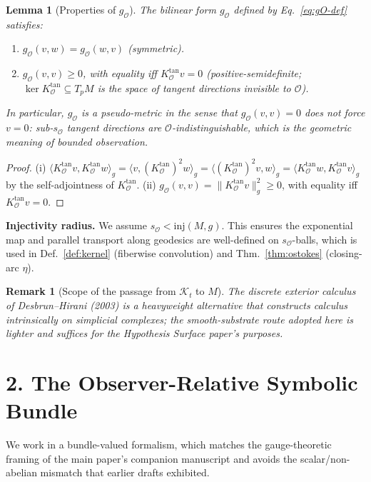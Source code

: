 \documentclass[11pt]{article}
\newtheorem{lemma}{Lemma}
\newtheorem{remark}{Remark}
\newcommand{\Kt}{\mathcal{K}_t}
\newcommand{\sO}{s_{\mathcal{O}}}  %
\newcommand{\Obs}{\mathcal{O}}
\newcommand{\gO}{g_{\Obs}}
\newcommand{\KO}{K_{\Obs}}
\begin{document}
\begin{lemma}[Properties of $\gO$]
\label{lem:gO}
The bilinear form $\gO$ defined by Eq.~\eqref{eq:gO-def} satisfies:
\begin{enumerate}[label=(\roman*)]
\item $\gO(v, w) = \gO(w, v)$ (symmetric).
\item $\gO(v, v) \geq 0$, with equality iff $\KO^{\mathrm{tan}} v = 0$
(positive-semidefinite; $\ker \KO^{\mathrm{tan}} \subseteq T_pM$ is
the space of tangent directions \emph{invisible to $\Obs$}).
\end{enumerate}
In particular, $\gO$ is a pseudo-metric in the sense that
$\gO(v, v) = 0$ does not force $v = 0$: sub-$\sO$ tangent directions
are $\Obs$-indistinguishable, which is the geometric meaning of
bounded observation.
\end{lemma}
\begin{proof}
(i) $\langle \KO^{\mathrm{tan}} v, \KO^{\mathrm{tan}} w \rangle_g
= \langle v, (\KO^{\mathrm{tan}})^2 w \rangle_g
= \langle (\KO^{\mathrm{tan}})^2 v, w \rangle_g
= \langle \KO^{\mathrm{tan}} w, \KO^{\mathrm{tan}} v \rangle_g$
by the self-adjointness of $\KO^{\mathrm{tan}}$.
(ii) $\gO(v, v) = \|\KO^{\mathrm{tan}} v\|_g^2 \geq 0$, with equality
iff $\KO^{\mathrm{tan}} v = 0$.
\end{proof}

\smallskip
\noindent\textbf{Injectivity radius.}
We assume $\sO < \mathrm{inj}(M, g)$. This ensures the exponential
map and parallel transport along geodesics are well-defined on
$\sO$-balls, which is used in Def.~\ref{def:kernel} (fiberwise
convolution) and Thm.~\ref{thm:ostokes} (closing-arc $\eta$).

\begin{remark}[Scope of the passage from $\Kt$ to $M$]
\label{rem:passage}
The discrete exterior calculus of Desbrun--Hirani (2003) is a
heavyweight alternative that constructs calculus intrinsically on
simplicial complexes; the smooth-substrate route adopted here is
lighter and suffices for the Hypothesis Surface paper's purposes.
\end{remark}

\section*{2. The Observer-Relative Symbolic Bundle}

We work in a bundle-valued formalism, which matches the gauge-theoretic
framing of the main paper's companion manuscript and avoids the
scalar/non-abelian mismatch that earlier drafts exhibited.
\end{document}
